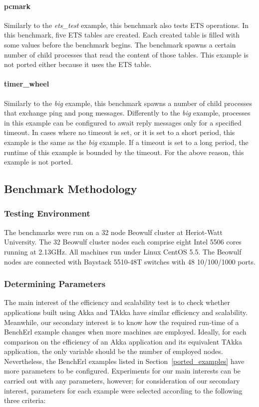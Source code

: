 \paragraph{pcmark} Similarly to the {\it ets\_test} example, this benchmark 
also tests ETS operations.  In this benchmark, five ETS tables are created. 
Each created table is filled with some values before the benchmark begins.  The 
benchmark spawns a certain number of child processes that read the content of 
those tables.  This example is not ported either because it uses the ETS table.


\paragraph{timer\_wheel} Similarly to the {\it big} example, this benchmark 
spawns a number of child processes that exchange ping and pong messages.  
Differently to the {\it big} example, processes in this example can be 
configured to await reply messages only for a specified timeout.  In cases where 
no timeout is set, or it is set to a short period, this example is the same 
as the {\it big} example.  If a timeout is set to a long period, the 
runtime of this example is bounded by the timeout.  For the above reason, this 
example is not ported.



\subsection{Benchmark Methodology}
\subsubsection{Testing Environment}

The benchmarks were run on a 32 node Beowulf cluster at Heriot-Watt 
University.  The 32 Beowulf cluster nodes each comprise eight Intel 5506 cores 
running at 2.13GHz. All machines run under Linux CentOS 5.5. The Beowulf 
nodes are connected with Baystack 5510-48T switches with 48 10/100/1000 ports.

\subsubsection{Determining Parameters}
\label{bench_parameters}

The main interest of the efficiency and scalability test is to check whether 
applications built using Akka and TAkka have similar efficiency and 
scalability.  Meanwhile, our secondary interest is to know how 
the required run-time of a BenchErl example changes when more 
machines are employed.  Ideally, for each comparison on the efficiency of 
an Akka application and its equivalent TAkka application, the only variable 
should be the number of employed nodes.  Nevertheless, the BenchErl examples 
listed in Section~\ref{ported_examples} have more parameters to be configured.  
Experiments for our main interests can be carried out with any 
parameters, however; for consideration of our secondary interest, 
parameters for each example were selected according to the following three 
criteria:

